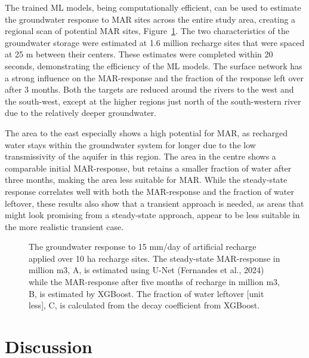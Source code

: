 \documentclass[
]{agujournal2019}
\begin{document}
The trained ML models, being computationally efficient, can be used to
estimate the groundwater response to MAR sites across the entire study
area, creating a regional scan of potential MAR sites,
Figure~\ref{fig-efficient_locations}. The two characteristics of the
groundwater storage were estimated at 1.6 million recharge sites that
were spaced at 25 m between their centers. These estimates were
completed within 20 seconds, demonstrating the efficiency of the ML
models. The surface network has a strong influence on the MAR-response
and the fraction of the response left over after 3 months. Both the
targets are reduced around the rivers to the west and the south-west,
except at the higher regions just north of the south-western river due
to the relatively deeper groundwater.

The area to the east especially shows a high potential for MAR, as
recharged water stays within the groundwater system for longer due to
the low transmissivity of the aquifer in this region. The area in the
centre shows a comparable initial MAR-response, but retains a smaller
fraction of water after three months, making the area less suitable for
MAR. While the steady-state response correlates well with both the
MAR-response and the fraction of water leftover, these results also show
that a transient approach is needed, as areas that might look promising
from a steady-state approach, appear to be less suitable in the more
realistic transient case.

\begin{figure}


\caption{\label{fig-efficient_locations}The groundwater response to 15
mm/day of artificial recharge applied over 10 ha recharge sites. The
steady-state MAR-response in million m3, A, is estimated using U-Net
(Fernandes et al., 2024) while the MAR-response after five months of
recharge in million m3, B, is estimated by XGBoost. The fraction of
water leftover {[}unit less{]}, C, is calculated from the decay
coefficient from XGBoost.}

\end{figure}%

\section{Discussion}\label{discussion}
\end{document}
